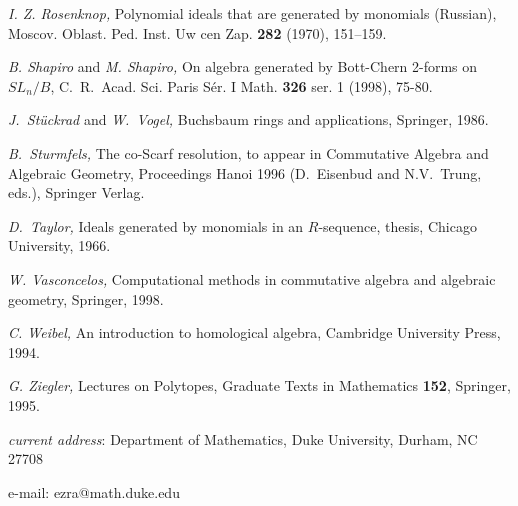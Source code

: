 \documentclass[12pt,leqno]{article}
\begin{document}
\begin{thebibliography}{99}
 {\it I. Z. Rosenknop,} Polynomial ideals that are generated
by monomials (Russian), Moscov. Oblast. Ped. Inst. Uw cen Zap. {\bf 282}
(1970), 151--159.

 {\it B. Shapiro} and {\it M. Shapiro,} On algebra generated
by Bott-Chern 2-forms on $SL_n/B$, C.~R.~Acad. Sci. Paris S\'er. I
Math. {\bf 326} ser. 1 (1998), 75-80.

 {\it J.\ St\"uckrad} and {\it W.\ Vogel,} Buchsbaum rings
and applications, Springer, 1986.

 {\it B.\ Sturmfels,} The co-Scarf resolution, to appear
in Commutative Algebra and Algebraic Geometry, Proceedings Hanoi
1996 (D.\ Eisenbud and N.V.\ Trung, eds.), Springer Verlag.

 {\it D.\ Taylor,} Ideals generated by monomials in an
$R$-sequence, thesis, Chicago University, 1966.

 {\it W. Vasconcelos,} Computational methods in commutative
algebra and algebraic geometry, Springer, 1998.

 {\it C. Weibel,} An introduction to homological algebra,
Cambridge University Press, 1994.

 {\it G. Ziegler,} Lectures on Polytopes, Graduate Texts in
Mathematics {\bf 152}, Springer, 1995.

\end{thebibliography}%

 \emph{current address}: Department of Mathematics, Duke University, Durham, NC 27708


 e-mail: ezra@math.duke.edu


\end{document}
